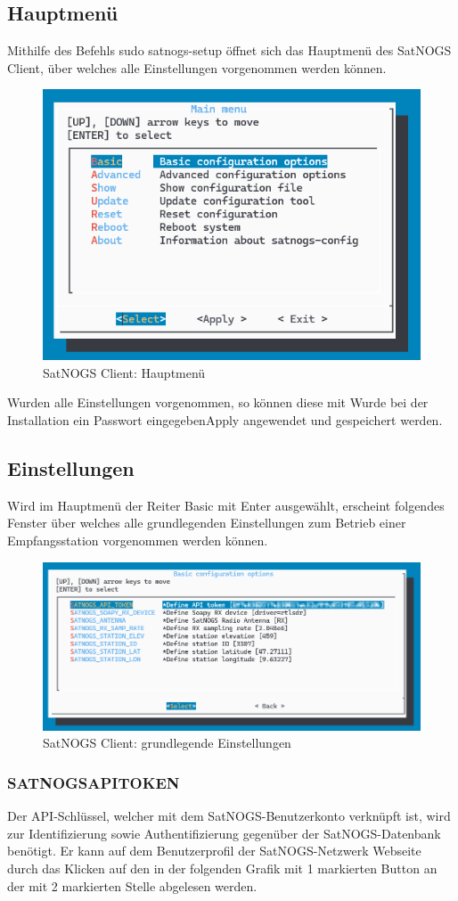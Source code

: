 \subsection{Hauptmenü}
Mithilfe des Befehls \glqq sudo satnogs-setup\grqq{} öffnet sich das Hauptmenü des SatNOGS Client, über welches alle Einstellungen vorgenommen werden können.

\begin{figure} [H]
	\centering
	\includegraphics[width=.5\linewidth]{../ref/mainmenu.png}
	\caption{SatNOGS Client: Hauptmenü}
	\label{fig:mainmenu}
\end{figure}

Wurden alle Einstellungen vorgenommen, so können diese mit Wurde bei der Installation ein Passwort eingegeben\glqq Apply\grqq{} angewendet und gespeichert werden.

\subsection{Einstellungen}
Wird im Hauptmenü der Reiter \glqq Basic\grqq{} mit \glqq Enter\grqq{} ausgewählt, erscheint folgendes Fenster über welches alle grundlegenden Einstellungen zum Betrieb einer Empfangsstation vorgenommen werden können.

\begin{figure} [H]
	\centering
	\includegraphics[width=.75\linewidth]{../ref/basic_configurations.png}
	\caption{SatNOGS Client: grundlegende Einstellungen}
	\label{fig:basic_configurations}
\end{figure}

\subsubsection{SATNOGS\textunderscore API\textunderscore TOKEN}
Der API-Schlüssel, welcher mit dem SatNOGS-Benutzerkonto verknüpft ist, wird zur Identifizierung sowie Authentifizierung gegenüber der SatNOGS-Datenbank benötigt. Er kann auf dem Benutzerprofil der SatNOGS-Netzwerk Webseite durch das Klicken auf den in der folgenden Grafik mit 1 markierten Button an der mit 2 markierten Stelle abgelesen werden.

